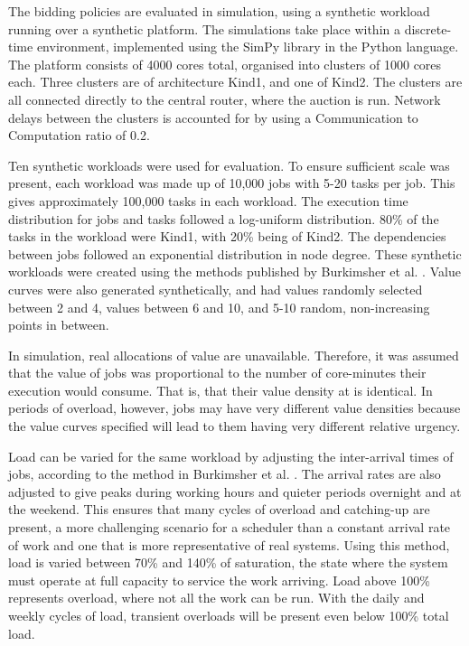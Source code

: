 \documentclass[english,british]{IEEEtran}
\begin{document}
The bidding policies are evaluated in simulation, using a synthetic
workload running over a synthetic platform. The simulations take place
within a discrete-time environment, implemented using the SimPy library
\cite{simpy} in the Python language. The platform consists of 4000
cores total, organised into clusters of 1000 cores each. Three clusters
are of architecture Kind1, and one of Kind2. The clusters are all
connected directly to the central router, where the auction is run.
Network delays between the clusters is accounted for by using a Communication
to Computation ratio of 0.2.

Ten synthetic workloads were used for evaluation. To ensure sufficient
scale was present, each workload was made up of 10,000 jobs with 5-20
tasks per job. This gives approximately 100,000 tasks in each workload.
The execution time distribution for jobs and tasks followed a log-uniform
distribution. 80\% of the tasks in the workload were Kind1, with 20\%
being of Kind2. The dependencies between jobs followed an exponential
distribution in node degree. These synthetic workloads were created
using the methods published by Burkimsher et al. \cite{burkimsher14}.
Value curves were also generated synthetically, and had 
values randomly selected between 2 and 4,  values
between 6 and 10, and 5-10 random, non-increasing points in between.

In simulation, real allocations of value are unavailable. Therefore,
it was assumed that the value of jobs was proportional to the number
of core-minutes their execution would consume. That is, that their
value density at  is identical. In periods of overload,
however, jobs may have very different value densities because the
value curves specified will lead to them having very different relative
urgency.

Load can be varied for the same workload by adjusting the inter-arrival
times of jobs, according to the method in Burkimsher et al. \cite{burkimsher14}.
The arrival rates are also adjusted to give peaks during working hours
and quieter periods overnight and at the weekend. This ensures that
many cycles of overload and catching-up are present, a more challenging
scenario for a scheduler than a constant arrival rate of work and
one that is more representative of real systems. Using this method,
load is varied between 70\% and 140\% of saturation, the state where
the system must operate at full capacity to service the work arriving.
Load above 100\% represents overload, where not all the work can be
run. With the daily and weekly cycles of load, transient overloads
will be present even below 100\% total load.
\end{document}
